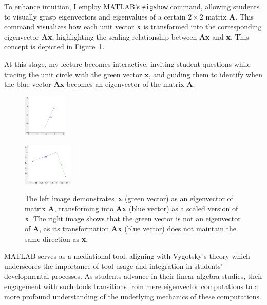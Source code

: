 \documentclass{article}
\begin{document}
To enhance intuition, I employ MATLAB's \texttt{eigshow} command, allowing students to visually grasp eigenvectors and eigenvalues of a certain $2 \times 2$ matrix \textbf{A}. 
This command visualizes how each unit vector \textbf{x} is transformed into the corresponding eigenvector \textbf{Ax}, highlighting the scaling relationship between \textbf{Ax} and \textbf{x}. 
This concept is depicted in Figure~\ref{fig:two_images}.

At this stage, my lecture becomes interactive, inviting student questions while tracing the unit circle with the green vector $\mathbf{x}$, and guiding them to identify when the blue vector $\mathbf{Ax}$ becomes an eigenvector of the matrix $\mathbf{A}$.

\begin{figure}[ht]
    \centering
    \begin{minipage}{0.45\textwidth}
        \centering
        \includegraphics[height=2cm]{pictures/pic1.png} %
        \label{fig:figure1}
    \end{minipage}\hfill
    \begin{minipage}{0.45\textwidth}
        \centering
        \includegraphics[height=2cm]{pictures/pic3.png} %
        \label{fig:figure2}
    \end{minipage}
    \caption{The left image demonstrates~\textbf{x} (green vector) as an eigenvector of matrix \textbf{A}, transforming into \textbf{Ax} (blue vector) as a scaled version of \textbf{x}. 
    The right image shows that the green vector is not an eigenvector of \textbf{A}, as its transformation \textbf{Ax} (blue vector) does not maintain the same direction as \textbf{x}.}
    \label{fig:two_images}
\end{figure}

MATLAB serves as a mediational tool, aligning with Vygotsky's theory which underscores the importance of tool usage and integration in students' developmental processes. As students advance in their linear algebra studies, their engagement with such tools transitions from mere eigenvector computations to a more profound understanding of the underlying mechanics of these computations.
\end{document}
